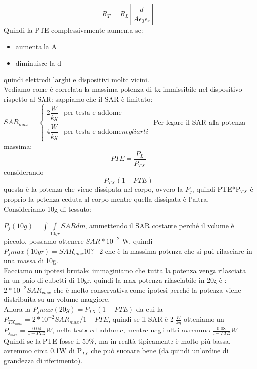 \documentclass[oneside, 12pt]{extbook}
\begin{document}
\begin{equation}
	R_T = R_L [\dfrac{d}{A \epsilon_0 \epsilon_r}]
\end{equation}
Quindi la PTE complessivamente aumenta se:
\begin{itemize}
	\item  aumenta la A
	\item diminuisce la d
\end{itemize}
quindi elettrodi larghi e dispositivi molto vicini.\\Vediamo come è correlata la massima potenza di tx immissibile nel dispositivo rispetto al SAR: sappiamo che il SAR è limitato: 
$
SAR_{max} =
\begin{cases}
	2 \dfrac{W}{kg} & \text{per testa e addome}\\
	4 \dfrac{W}{kg} & \text{per testa e addome} negli arti
\end{cases}$
Per legare il SAR alla potenza massima:
\begin{equation}
	PTE = \frac{P_L}{P_{TX}}	
\end{equation}
considerando 
\begin{equation}
	P_{TX}(1-PTE)	
\end{equation}
questa è la potenza che viene dissipata nel corpo, ovvero la $P_j$, quindi PTE*P$_{TX}$ è proprio la potenza ceduta al corpo mentre quella dissipata è l'altra.\\Consideriamo 10g di tessuto:

$P_j(10g) = \int\int\limits_{10gr} SAR dm$, ammettendo il SAR costante perché il volume è piccolo, possiamo ottenere $SAR * 10^{-2}$ W, quindi $P_jmax (10gr) = SAR_{max}10?{-2}$ che è la massima potenza che si può rilasciare in una massa di 10g.\\Facciamo un ipotesi brutale: immaginiamo che tutta la potenza venga rilasciata in un paio di cubetti di 10gr, quindi la max potenza rilasciabile in 20g è : $2*10^{-2}SAR_{max}$ che è molto conservativa come ipotesi perché la potenza viene distribuita su un volume maggiore.\\Allora la $P_jmax(20g) = P_{TX}(1-PTE)$ da cui la $P_{TX_{max}} = 2*10^{-2}SAR_{max}/1 - PTE$, quindi se il SAR è 2 $\frac{W}{kg}$ otteniamo un $P_{j_{max}} = \frac{0.04}{1-PTE} W$, nella testa ed addome, mentre negli altri avremmo $\frac{0.08}{1-PTE} W$.\\Quindi se la PTE fosse il 50\%, ma in realtà tipicamente è molto più bassa, avremmo circa 0.1W di P$_{TX}$ che può suonare bene (da quindi un'ordine di grandezza di riferimento).
\end{document}
